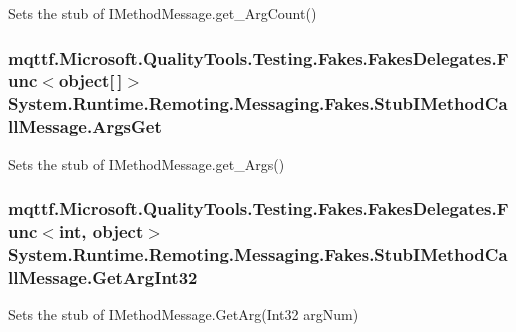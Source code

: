 Sets the stub of I\-Method\-Message.\-get\-\_\-\-Arg\-Count()

\hypertarget{class_system_1_1_runtime_1_1_remoting_1_1_messaging_1_1_fakes_1_1_stub_i_method_call_message_a672787e8d5843ca3caee55dea5afe4cd}{
\subsubsection[{Args\-Get}]{\setlength{\rightskip}{0pt plus 5cm}mqttf.\-Microsoft.\-Quality\-Tools.\-Testing.\-Fakes.\-Fakes\-Delegates.\-Func$<$object\mbox{[}$\,$\mbox{]}$>$ System.\-Runtime.\-Remoting.\-Messaging.\-Fakes.\-Stub\-I\-Method\-Call\-Message.\-Args\-Get}}\label{class_system_1_1_runtime_1_1_remoting_1_1_messaging_1_1_fakes_1_1_stub_i_method_call_message_a672787e8d5843ca3caee55dea5afe4cd}


Sets the stub of I\-Method\-Message.\-get\-\_\-\-Args()

\hypertarget{class_system_1_1_runtime_1_1_remoting_1_1_messaging_1_1_fakes_1_1_stub_i_method_call_message_a6e063a9a7080152b5100c27c2119be6f}{
\subsubsection[{Get\-Arg\-Int32}]{\setlength{\rightskip}{0pt plus 5cm}mqttf.\-Microsoft.\-Quality\-Tools.\-Testing.\-Fakes.\-Fakes\-Delegates.\-Func$<$int, object$>$ System.\-Runtime.\-Remoting.\-Messaging.\-Fakes.\-Stub\-I\-Method\-Call\-Message.\-Get\-Arg\-Int32}}\label{class_system_1_1_runtime_1_1_remoting_1_1_messaging_1_1_fakes_1_1_stub_i_method_call_message_a6e063a9a7080152b5100c27c2119be6f}


Sets the stub of I\-Method\-Message.\-Get\-Arg(\-Int32 arg\-Num)

